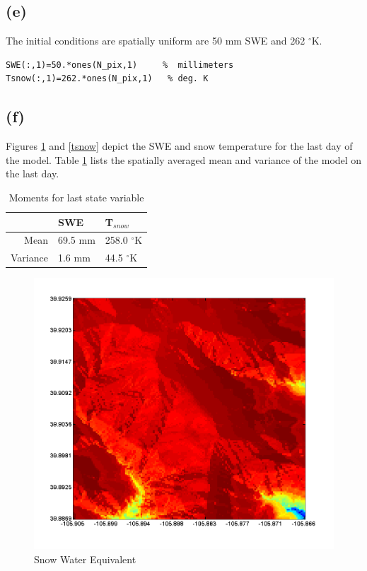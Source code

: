 \documentclass[fleqn, letterpaper]{tufte-handout}
\begin{document}
\subsection{(e)}
The initial conditions are spatially uniform are 50 mm SWE and 262 $^\circ$K.
\begin{verbatim}
SWE(:,1)=50.*ones(N_pix,1)     %  millimeters
Tsnow(:,1)=262.*ones(N_pix,1)   % deg. K
\end{verbatim}

\subsection{(f)}
Figures \ref{swe} and \ref{tsnow} depict the SWE and snow temperature for the last day of the model. Table \ref{stats} lists the spatially averaged mean and variance of the model on the last day.
\begin{table}
	\begin{tabular}{rll}
		& SWE & T$_{snow}$ \\
		\midrule
		Mean & 69.5 mm & 258.0  $^\circ$K\\
	Variance & 1.6 mm & 44.5 $^\circ$K
	\end{tabular}
	\caption{Moments for last state variable}
	\label{stats}
\end{table}
\begin{figure}
	\includegraphics[width=\textwidth]{swe}
	\caption{Snow Water Equivalent}
	\label{swe}
\end{figure}
\end{document}
